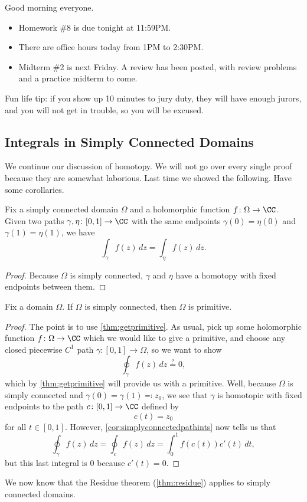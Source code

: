 \documentclass[../notes.tex]{subfiles}
\begin{document}

Good morning everyone.
\begin{itemize}
	\item Homework \#8 is due tonight at 11:59PM.
	\item There are office hours today from 1PM to 2:30PM.
	\item Midterm \#2 is next Friday. A review has been posted, with review problems and a practice midterm to come.
\end{itemize}
\begin{remark}[Morrow]
	Fun life tip: if you show up 10 minutes to jury duty, they will have enough jurors, and you will not get in trouble, so you will be excused.
\end{remark}

\subsection{Integrals in Simply Connected Domains}
We continue our discussion of homotopy. We will not go over every single proof because they are somewhat laborious. Last time we showed the following.
\homoind*
\noindent Have some corollaries.
\begin{corollary} \label{cor:simplyconnectedpathints}
	Fix a simply connected domain $\Omega$ and a holomorphic function $f\colon \Omega\to\CC$. Given two paths $\gamma,\eta\colon [0,1]\to\CC$ with the same endpoints $\gamma(0)=\eta(0)$ and $\gamma(1)=\eta(1)$, we have
	\[\int_\gamma f(z)\,dz=\int_\eta f(z)\,dz.\]
\end{corollary}
\begin{proof}
	Because $\Omega$ is simply connected, $\gamma$ and $\eta$ have a homotopy with fixed endpoints between them.
\end{proof}
\begin{corollary} \label{cor:simpconnisprimitive}
	Fix a domain $\Omega$. If $\Omega$ is simply connected, then $\Omega$ is primitive.
\end{corollary}
\begin{proof}
	The point is to use \autoref{thm:getprimitive}. As usual, pick up some holomorphic function $f\colon \Omega\to\CC$ which we would like to give a primitive, and choose any closed piecewise $C^1$ path $\gamma\colon [0,1]\to\Omega$, so we want to show
	\[\oint_\gamma f(z)\,dz\stackrel?=0,\]
	which by \autoref{thm:getprimitive} will provide us with a primitive. Well, because $\Omega$ is simply connected and $\gamma(0)=\gamma(1)\eqqcolon z_0$, we see that $\gamma$ is homotopic with fixed endpoints to the path $c\colon [0,1]\to\CC$ defined by
	\[c(t)=z_0\]
	for all $t\in[0,1]$. However, \autoref{cor:simplyconnectedpathints} now tells us that
	\[\oint_\gamma f(z)\,dz=\oint_c f(z)\,dz=\int_0^1f(c(t))c'(t)\,dt,\]
	but this last integral is $0$ because $c'(t)=0$.
\end{proof}
\begin{example}
	We now know that the Residue theorem (\autoref{thm:residue}) applies to simply connected domains.
\end{example}
\end{document}
